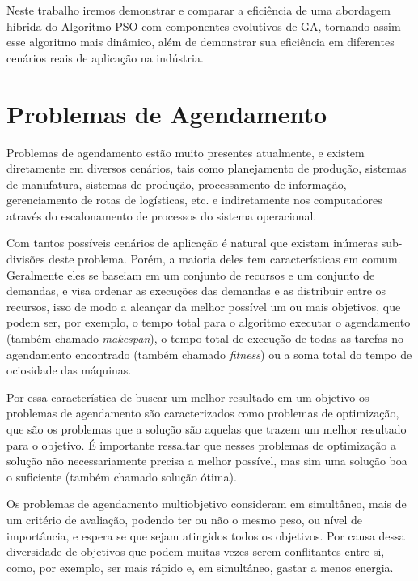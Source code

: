     Neste trabalho iremos demonstrar e comparar a eficiência de uma abordagem híbrida do Algoritmo PSO com componentes evolutivos de GA, tornando assim esse algoritmo mais dinâmico, além de demonstrar sua eficiência em diferentes cenários reais de aplicação na indústria.\hfill


\section{Problemas de Agendamento}
        Problemas de agendamento estão muito presentes atualmente, e existem diretamente em diversos cenários, tais como planejamento de produção, sistemas de manufatura, sistemas de produção, processamento de informação, gerenciamento de rotas de logísticas, etc. e indiretamente nos computadores através do escalonamento de processos do sistema operacional.\hfill\vspace{\onelineskip}

        Com tantos possíveis cenários de aplicação é natural que existam inúmeras sub-divisões deste problema. Porém, a maioria deles tem características em comum. Geralmente eles se baseiam em um conjunto de recursos e um conjunto de demandas, e visa ordenar as execuções das demandas e as distribuir entre os recursos, isso de modo a alcançar da melhor possível um ou mais objetivos, que podem ser, por exemplo, o tempo total para o algoritmo executar o agendamento (também chamado \textit{makespan}), o tempo total de execução de todas as tarefas no agendamento encontrado (também chamado \textit{fitness}) ou a soma total do tempo de ociosidade das máquinas.\hfill\vspace{\onelineskip}

        Por essa característica de buscar um melhor resultado em um objetivo os problemas de agendamento são caracterizados como problemas de optimização, que são os problemas que a solução são aquelas que trazem um melhor resultado para o objetivo. É importante ressaltar que nesses problemas de optimização a solução não necessariamente precisa a melhor possível, mas sim uma solução boa o suficiente (também chamado solução ótima).\hfill\vspace{\onelineskip}
        
        Os problemas de agendamento multiobjetivo consideram em simultâneo, mais de um critério de avaliação, podendo ter ou não o mesmo peso, ou nível de importância, e espera se que sejam atingidos todos os objetivos. Por causa dessa diversidade de objetivos que podem muitas vezes serem conflitantes entre si, como, por exemplo, ser mais rápido e, em simultâneo, gastar a menos energia.\hfill\vspace{\onelineskip}
        
